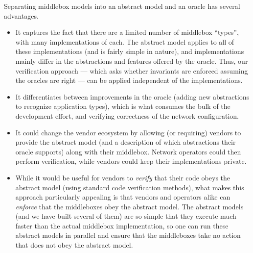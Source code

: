 Separating middlebox models into an abstract model and an oracle has several advantages.
\begin{itemize}
\item It captures the fact that there are a limited number of middlebox ``types'', with many implementations of each. The abstract model applies to all of these implementations (and is fairly simple in nature), and implementations mainly differ in the abstractions and features offered by the oracle.  Thus, our verification approach --- which asks whether invariants are enforced assuming the oracles are right --- can be applied independent of the implementations.
\item It differentiates between improvements in the oracle (\eg adding new abstractions to recognize application types), which is what consumes the bulk of the development effort, and verifying correctness of the network configuration.
\item It could change the vendor ecosystem by allowing (or requiring) vendors to provide the abstract model (and a description of which abstractions their oracle supports) along with their middlebox. Network operators could then perform verification, while vendors could keep their implementations private.
\item While it would be useful for vendors to {\em verify} that their code obeys the abstract model (using standard code verification methods), what makes this approach particularly appealing is that vendors and operators alike can {\em enforce} that the middleboxes obey the abstract model. The abstract models (and we have built several of them) are so simple that they execute much faster than the actual middlebox implementation, so one can run these abstract models in parallel and ensure that the middleboxes take no action that does not obey the abstract model.
\end{itemize}
